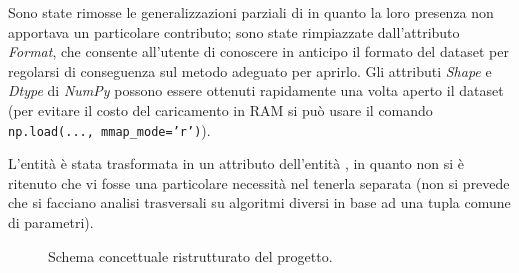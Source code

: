 \documentclass{article}
\begin{document}
Sono state rimosse le generalizzazioni parziali di  in quanto la loro presenza non apportava un particolare contributo; sono state rimpiazzate dall'attributo \emph{Format}, che consente all'utente di conoscere in anticipo il formato del dataset per regolarsi di conseguenza sul metodo adeguato per aprirlo. Gli attributi \emph{Shape} e \emph{Dtype} di \emph{NumPy} possono essere ottenuti rapidamente una volta aperto il dataset (per evitare il costo del caricamento in RAM si può usare il comando \texttt{np.load(..., mmap\_mode='r')}).

L'entità  è stata trasformata in un attributo dell'entità , in quanto non si è ritenuto che vi fosse una particolare necessità nel tenerla separata (non si prevede che si facciano analisi trasversali su algoritmi diversi in base ad una tupla comune di parametri).

\begin{figure}[H]
    \caption{Schema concettuale ristrutturato del progetto.}
\end{figure}
\end{document}
